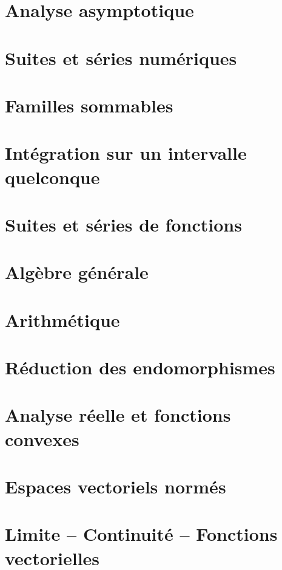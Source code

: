 \documentclass{report}
\begin{document}
\chapter{Analyse asymptotique}

\chapter{Suites et séries numériques}

\chapter{Familles sommables}

\chapter{Intégration sur un intervalle quelconque}

\chapter{Suites et séries de fonctions}

\chapter{Algèbre générale}

\chapter{Arithmétique}

\chapter{Réduction des endomorphismes}

\chapter{Analyse réelle et fonctions convexes}

\chapter{Espaces vectoriels normés}

\chapter{Limite -- Continuité -- Fonctions vectorielles}
\end{document}
